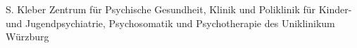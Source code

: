 
                {S.  Kleber}
                {Zentrum für Psychische Gesundheit, Klinik und Poliklinik für Kinder-und Jugendpsychiatrie, Psychosomatik  und Psychotherapie des Uniklinikum Würzburg}
                